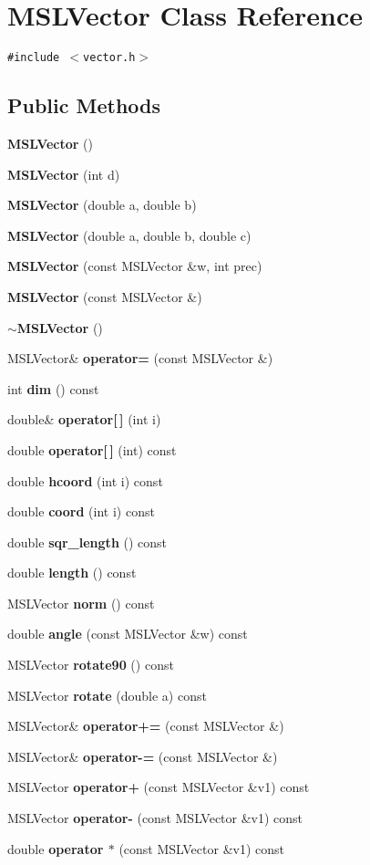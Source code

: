 \section{MSLVector  Class Reference}
\label{classMSLVector}
{\tt \#include $<$vector.h$>$}

\subsection*{Public Methods}
\begin{CompactItemize}
\item 
{\bf MSLVector} ()
\item 
{\bf MSLVector} (int d)
\item 
{\bf MSLVector} (double a, double b)
\item 
{\bf MSLVector} (double a, double b, double c)
\item 
{\bf MSLVector} (const MSLVector \&w, int prec)
\item 
{\bf MSLVector} (const MSLVector \&)
\item 
{\bf $\sim$MSLVector} ()
\item 
MSLVector\& {\bf operator=} (const MSLVector \&)
\item 
int {\bf dim} () const
\item 
double\& {\bf operator[$\,$]} (int i)
\item 
double {\bf operator[$\,$]} (int) const
\item 
double {\bf hcoord} (int i) const
\item 
double {\bf coord} (int i) const
\item 
double {\bf sqr\_\-length} () const
\item 
double {\bf length} () const
\item 
MSLVector {\bf norm} () const
\item 
double {\bf angle} (const MSLVector \&w) const
\item 
MSLVector {\bf rotate90} () const
\item 
MSLVector {\bf rotate} (double a) const
\item 
MSLVector\& {\bf operator+=} (const MSLVector \&)
\item 
MSLVector\& {\bf operator-=} (const MSLVector \&)
\item 
MSLVector {\bf operator+} (const MSLVector \&v1) const
\item 
MSLVector {\bf operator-} (const MSLVector \&v1) const
\item 
double {\bf operator $\ast$} (const MSLVector \&v1) const

\end{CompactItemize}
